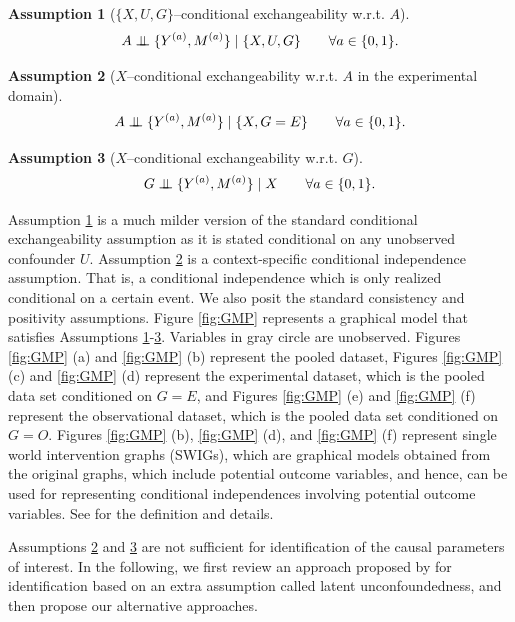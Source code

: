 \documentclass[10pt]{article}
\newtheorem{assumption}{Assumption}
\newcommand{\independent}{\perp\mkern-9.5mu\perp}
\begin{document}
\begin{assumption}[$\{X,U,G\}$--conditional exchangeability w.r.t. $A$]
\label{assumption:exchangeU}
\[
A\independent\{Y^{(a)},M^{(a)}\}\mid \{X,U,G\}\qquad \forall a\in\{0,1\}.
\]
\end{assumption}
\begin{assumption}[$X$--conditional exchangeability  w.r.t. $A$ in the experimental domain]
\label{assumption:IntVal}
\[
A\independent\{Y^{(a)},M^{(a)}\}\mid \{X,G=E\}\qquad \forall a\in\{0,1\}.
\]	
\end{assumption}
\begin{assumption}[$X$--conditional exchangeability  w.r.t. $G$]
\label{assumption:ExVal}
\[
G\independent\{Y^{(a)},M^{(a)}\}\mid X\qquad \forall a\in\{0,1\}.
\]	
\end{assumption}
Assumption \ref{assumption:exchangeU} is a much milder version of the standard conditional exchangeability assumption \citep{hernan2020causal} as it is stated conditional on any unobserved confounder $U$.
Assumption \ref{assumption:IntVal} is a context-specific conditional independence assumption. That is, a conditional independence which is only realized conditional on a certain event.
We also posit the standard consistency and positivity assumptions. Figure \ref{fig:GMP} represents a graphical model that satisfies Assumptions \ref{assumption:exchangeU}-\ref{assumption:ExVal}. Variables in gray circle are unobserved.
 Figures \ref{fig:GMP} (a) and \ref{fig:GMP} (b) represent the pooled dataset, Figures \ref{fig:GMP} (c) and \ref{fig:GMP} (d) represent the experimental dataset, which is the pooled data set conditioned on $G=E$, and Figures \ref{fig:GMP} (e) and \ref{fig:GMP} (f) represent the observational dataset, which is the pooled data set conditioned on $G=O$. Figures \ref{fig:GMP} (b), \ref{fig:GMP} (d), and \ref{fig:GMP} (f) represent single world intervention graphs (SWIGs), which are graphical models obtained from the original graphs, which include potential outcome variables, and hence, can be used for representing conditional independences involving potential outcome variables. See \citep{richardson2013single} for the definition and details.

Assumptions \ref{assumption:IntVal} and \ref{assumption:ExVal} are not sufficient for identification of the causal parameters of interest. In the following, we first review an approach proposed by \cite{athey2020combining} for identification based on an extra assumption called latent unconfoundedness, and then propose our alternative approaches. 
\end{document}
